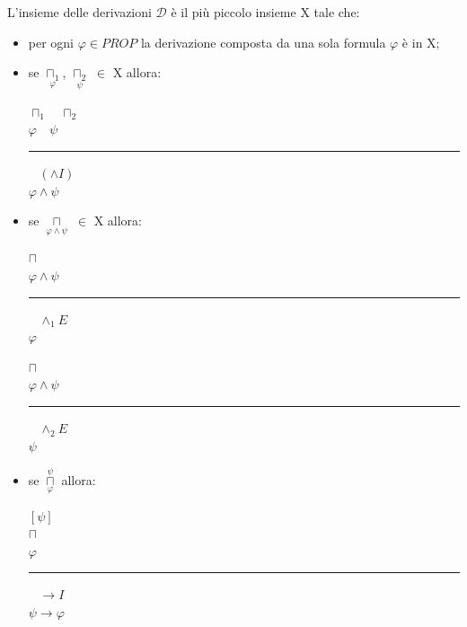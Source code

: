 \documentclass[a4paper, 12pt]{book}
\newcommand{\definizione}[2]{%
\vspace{15pt}%
\begin{tcolorbox}[
  colback=cyan!5!white,
  colframe=blue!50!black,
  title=\textbf{Definizione: #1}, %
  coltitle=white,
  fonttitle=\bfseries,
  arc=3mm,
  boxrule=0.5pt,
  enhanced,
  breakable
]
#2 %
\end{tcolorbox}
\vspace{15pt}%
}
\begin{document}
  \definizione{Insieme delle derivazioni}{
    L'insieme delle derivazioni \(\mathcal{D}\) è il più piccolo insieme X tale che:
    \begin{itemize}
      \item per ogni \(\varphi \in PROP \) la derivazione composta da una sola formula \(\varphi\) è in X;
      \item se $\underset{\varphi}{\sqcap_1}$, $\underset{\psi}{\sqcap_2}$ \(\in\) X allora:
      \begin{center}
        \(
        \sqcap_1 \quad \sqcap_2
        \)\\
        \(
        \varphi \quad \psi
        \)\\[-0.5em]
        \hspace{1cm}\rule{3cm}{0.4pt}\(\;\;\; (\land I)\)\\
        \(
          \varphi \land \psi
        \)
      \end{center}
      \item se $\underset{\varphi \land \psi}{\sqcap}$ $\in$ X allora:
      \begin{center}
        \begin{minipage}[t]{0.45\textwidth}
        \centering
        \(\sqcap \)\\
        \(\varphi \land \psi\)\\[-0.7em] %
        \hspace{1cm} \rule{2cm}{0.4pt} \(\;\;\; \land_1 E\)\\  
        \(
          \varphi
        \) 
        \end{minipage}
        \begin{minipage}[t]{0.45\textwidth}
        \centering
        \(\sqcap\)\\
        \(\varphi \land \psi\)\\[-0.7em] %
      \hspace{1cm} \rule{2.5cm}{0.4pt} \(\;\;\;\land_2 E\)\\  
      \(
      \psi
      \) 
      \end{minipage}
    \end{center}

    \item se $\overset{\psi}{\underset{\varphi}{\sqcap}}$ allora: 
    \begin{center}
      \( [\psi] \)\\
      \( \sqcap \)\\
      \(\varphi\)\\[-0.5em]
      \hspace{1cm}\rule{3cm}{0.4pt}\(\;\;\; \rightarrow I\)\\
      \(
      \psi \rightarrow \varphi
      \)
    \end{center}


\end{itemize}}
\end{document}
